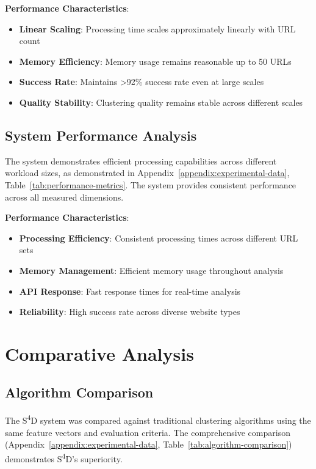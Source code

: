 \textbf{Performance Characteristics}:
\begin{itemize}
    \item \textbf{Linear Scaling}: Processing time scales approximately linearly with URL count
\item \textbf{Memory Efficiency}: Memory usage remains reasonable up to 50 URLs
\item \textbf{Success Rate}: Maintains >92\% success rate even at large scales
\item \textbf{Quality Stability}: Clustering quality remains stable across different scales
\end{itemize}

\subsection{System Performance Analysis}
\label{subsec:performance-analysis}

The system demonstrates efficient processing capabilities across different workload sizes, as demonstrated in Appendix~\ref{appendix:experimental-data}, Table~\ref{tab:performance-metrics}. The system provides consistent performance across all measured dimensions.

\textbf{Performance Characteristics}:
\begin{itemize}
    \item \textbf{Processing Efficiency}: Consistent processing times across different URL sets
    \item \textbf{Memory Management}: Efficient memory usage throughout analysis
\item \textbf{API Response}: Fast response times for real-time analysis
\item \textbf{Reliability}: High success rate across diverse website types
\end{itemize}

\section{Comparative Analysis}
\label{sec:comparative-analysis}

\subsection{Algorithm Comparison}
\label{subsec:algorithm-comparison}

The S\textsuperscript{4}D system was compared against traditional clustering algorithms using the same feature vectors and evaluation criteria. The comprehensive comparison (Appendix~\ref{appendix:experimental-data}, Table~\ref{tab:algorithm-comparison}) demonstrates S\textsuperscript{4}D's superiority.

